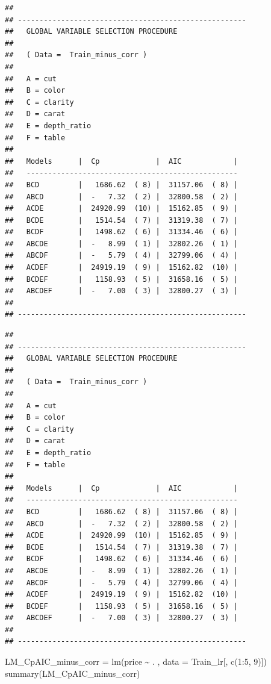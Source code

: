 \documentclass[
]{article}
\newenvironment{Shaded}{\begin{snugshade}}{\end{snugshade}}
\newcommand{\AttributeTok}[1]{\textcolor[rgb]{0.77,0.63,0.00}{#1}}
\newcommand{\DecValTok}[1]{\textcolor[rgb]{0.00,0.00,0.81}{#1}}
\newcommand{\FunctionTok}[1]{\textcolor[rgb]{0.00,0.00,0.00}{#1}}
\newcommand{\NormalTok}[1]{#1}
\newcommand{\OtherTok}[1]{\textcolor[rgb]{0.56,0.35,0.01}{#1}}
\newcommand{\SpecialCharTok}[1]{\textcolor[rgb]{0.00,0.00,0.00}{#1}}
\begin{document}
\begin{verbatim}
## 
## ----------------------------------------------------- 
##   GLOBAL VARIABLE SELECTION PROCEDURE 
## 
##   ( Data =  Train_minus_corr )
## 
##   A = cut              
##   B = color            
##   C = clarity          
##   D = carat            
##   E = depth_ratio      
##   F = table            
## 
##   Models      |  Cp             |  AIC            |
##   ------------------------------------------------- 
##   BCD         |   1686.62  ( 8) |  31157.06  ( 8) |
##   ABCD        |  -   7.32  ( 2) |  32800.58  ( 2) |
##   ACDE        |  24920.99  (10) |  15162.85  ( 9) |
##   BCDE        |   1514.54  ( 7) |  31319.38  ( 7) |
##   BCDF        |   1498.62  ( 6) |  31334.46  ( 6) |
##   ABCDE       |  -   8.99  ( 1) |  32802.26  ( 1) |
##   ABCDF       |  -   5.79  ( 4) |  32799.06  ( 4) |
##   ACDEF       |  24919.19  ( 9) |  15162.82  (10) |
##   BCDEF       |   1158.93  ( 5) |  31658.16  ( 5) |
##   ABCDEF      |  -   7.00  ( 3) |  32800.27  ( 3) |
## 
## -----------------------------------------------------
\end{verbatim}

\begin{verbatim}
## 
## ----------------------------------------------------- 
##   GLOBAL VARIABLE SELECTION PROCEDURE 
## 
##   ( Data =  Train_minus_corr )
## 
##   A = cut              
##   B = color            
##   C = clarity          
##   D = carat            
##   E = depth_ratio      
##   F = table            
## 
##   Models      |  Cp             |  AIC            |
##   ------------------------------------------------- 
##   BCD         |   1686.62  ( 8) |  31157.06  ( 8) |
##   ABCD        |  -   7.32  ( 2) |  32800.58  ( 2) |
##   ACDE        |  24920.99  (10) |  15162.85  ( 9) |
##   BCDE        |   1514.54  ( 7) |  31319.38  ( 7) |
##   BCDF        |   1498.62  ( 6) |  31334.46  ( 6) |
##   ABCDE       |  -   8.99  ( 1) |  32802.26  ( 1) |
##   ABCDF       |  -   5.79  ( 4) |  32799.06  ( 4) |
##   ACDEF       |  24919.19  ( 9) |  15162.82  (10) |
##   BCDEF       |   1158.93  ( 5) |  31658.16  ( 5) |
##   ABCDEF      |  -   7.00  ( 3) |  32800.27  ( 3) |
## 
## -----------------------------------------------------
\end{verbatim}

\begin{Shaded}
\begin{Highlighting}[]
\NormalTok{LM\_CpAIC\_minus\_corr }\OtherTok{=} \FunctionTok{lm}\NormalTok{(price }\SpecialCharTok{\textasciitilde{}}\NormalTok{ . , }\AttributeTok{data =}\NormalTok{ Train\_lr[, }\FunctionTok{c}\NormalTok{(}\DecValTok{1}\SpecialCharTok{:}\DecValTok{5}\NormalTok{, }\DecValTok{9}\NormalTok{)])}
\FunctionTok{summary}\NormalTok{(LM\_CpAIC\_minus\_corr)}
\end{Highlighting}
\end{Shaded}
\end{document}
